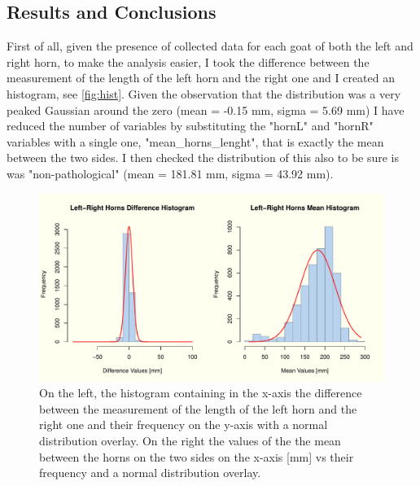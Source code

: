 \documentclass{article}
\begin{document}
\subsection{Results and Conclusions}
First of all, given the presence of collected data for each goat of both the left and right horn, to make the analysis easier, I took the difference between the measurement of the length of the left horn and the right one and I created an histogram, see  \autoref{fig:hist}. Given the observation that the distribution was a very peaked Gaussian around the zero (mean = -0.15 mm, sigma = 5.69 mm) I have reduced the number of variables by substituting the "hornL" and "hornR" variables with a single one, "mean\_horns\_lenght", that is exactly the mean between the two sides. I then checked the distribution of this also to be sure is was "non-pathological" (mean = 181.81 mm, sigma = 43.92 mm).
\begin{figure}[H]
\centering
  \includegraphics[scale=0.4]{histograms.pdf}
\caption{On the left, the histogram containing in the x-axis the difference between the measurement of the length of the left horn and the right one and their frequency on the y-axis with a normal distribution overlay. On the right the values of the the mean between the horns on the two sides on the x-axis [mm] vs their frequency and a normal distribution overlay.}
  \label{fig:hist}
\end{figure}
\end{document}
